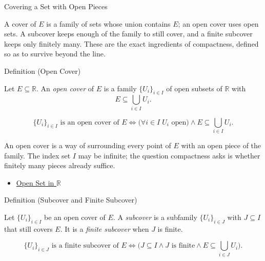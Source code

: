 \label{sec:covers-and-subcovers}

\begin{topicbox}{Covering a Set with Open Pieces}
\begin{exposition}
A cover of $E$ is a family of sets whose union contains $E$; an open cover uses open sets. A subcover keeps enough of the family to still cover, and a finite subcover keeps only finitely many. These are the exact ingredients of compactness, defined so as to survive beyond the line.
\end{exposition}
\end{topicbox}
\begin{definitionbox}{Definition (Open Cover)}
\begin{definition}
\label{def:real-open-cover}
Let $E\subseteq\mathbb{R}$. An \emph{open cover} of $E$ is a family $\{U_{i}\}_{i\in I}$ of open subsets of $\mathbb{R}$ with
\[
E\subseteq\bigcup_{i\in I} U_{i}.
\]
\end{definition}
\end{definitionbox}
\begin{remark*}
\[
\{U_i\}_{i\in I} \text{ is an open cover of } E \Longleftrightarrow \bigl(\forall i\in I\;U_i \text{ open}\bigr)\land E\subseteq\textstyle\bigcup_{i\in I}U_i.
\]
\end{remark*}
\begin{remark*}[Interpretation]
An open cover is a way of surrounding every point of $E$ with an open piece of the family. The index set $I$ may be infinite; the question compactness asks is whether finitely many pieces already suffice.
\end{remark*}
\begin{dependencies}
\begin{itemize}
  \item \hyperref[def:open-set]{Open Set in $\mathbb{R}$}
\end{itemize}
\end{dependencies}
\begin{definitionbox}{Definition (Subcover and Finite Subcover)}
\begin{definition}
\label{def:finite-subcover}
Let $\{U_{i}\}_{i\in I}$ be an open cover of $E$. A \emph{subcover} is a subfamily $\{U_{i}\}_{i\in J}$ with $J\subseteq I$ that still covers $E$. It is a \emph{finite subcover} when $J$ is finite.
\end{definition}
\end{definitionbox}
\begin{remark*}
\[
\{U_i\}_{i\in J} \text{ is a finite subcover of } E
\Longleftrightarrow
\bigl(J\subseteq I \land J \text{ is finite} \land E\subseteq\textstyle\bigcup_{i\in J}U_i\bigr).
\]
\end{remark*}
